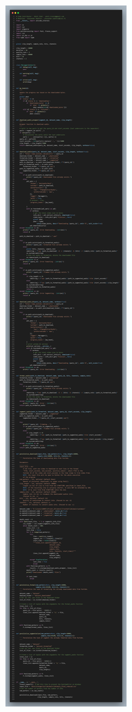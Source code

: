 \documentclass[aspectratio=169, 11pt]{beamer}
\begin{document}
\begin{frame}
\begin{columns}
    \begin{column}{0.05\textwidth} %
      \centering
      \scalebox{2.0}{$\rightarrow$} %
    \end{column}

    \begin{column}{0.1\textwidth} %
      \includegraphics[width=\textwidth]{image/long_code.png}
    \end{column}
  \end{columns}
\end{frame}
\end{document}
